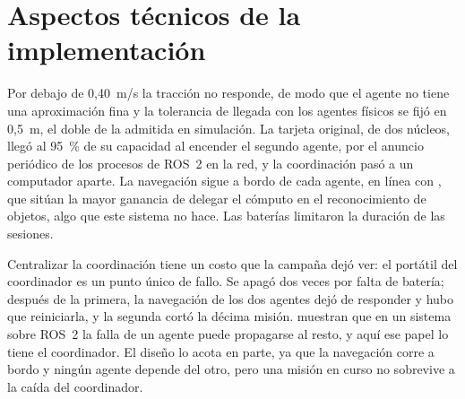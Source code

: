 \section{Aspectos técnicos de la implementación}

Por debajo de 0,40~m/s la tracción no responde, de modo que el agente no tiene una aproximación fina y la tolerancia de llegada con los agentes físicos se fijó en 0,5~m, el doble de la admitida en simulación. La tarjeta original, de dos núcleos, llegó al 95~\% de su capacidad al encender el segundo agente, por el anuncio periódico de los procesos de ROS~2 en la red, y la coordinación pasó a un computador aparte. La navegación sigue a bordo de cada agente, en línea con \textcite{dordevic2023offloading}, que sitúan la mayor ganancia de delegar el cómputo en el reconocimiento de objetos, algo que este sistema no hace. Las baterías limitaron la duración de las sesiones.

Centralizar la coordinación tiene un costo que la campaña dejó ver: el portátil del coordinador es un punto único de fallo. Se apagó dos veces por falta de batería; después de la primera, la navegación de los dos agentes dejó de responder y hubo que reiniciarla, y la segunda cortó la décima misión. \textcite{zhang2025kubernetes} muestran que en un sistema sobre ROS~2 la falla de un agente puede propagarse al resto, y aquí ese papel lo tiene el coordinador. El diseño lo acota en parte, ya que la navegación corre a bordo y ningún agente depende del otro, pero una misión en curso no sobrevive a la caída del coordinador.
